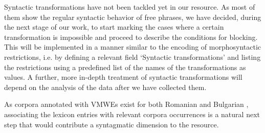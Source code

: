 \documentclass[output=paper,colorlinks,citecolor=brown]{langscibook}
\begin{document}

Syntactic transformations have not been tackled yet in our resource. As most of them show the regular syntactic behavior of free phrases, 
we have decided, during the next stage of our work, to start marking the cases where a certain transformation is impossible and proceed to describe the conditions for blocking. 
This will be implemented in a manner similar to the encoding of morphosyntactic restrictions, i.e. by defining a relevant field `Syntactic transformations' and listing the restrictions using a predefined list of the names of the transformations as values. A further, more in-depth treatment of syntactic transformations will depend on the analysis of the data after we have collected them.


As corpora annotated with VMWEs exist for both Romanian \citep{barbu-mititelu-etal-2019-romanian} and Bulgarian \citep{2012-The-Bulgarian-National-Co}, associating the lexicon entries with relevant corpora occurrences is a natural next step that would contribute %
a syntagmatic dimension to the resource. 

\end{document}
